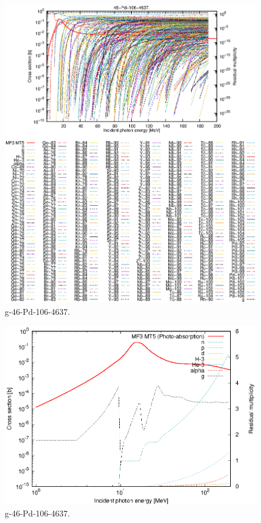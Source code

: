 \begin{figure}
 \includegraphics[width=\linewidth]{eps/g_46-Pd-106_4637.eps}
  \caption{g-46-Pd-106-4637.}
\end{figure}
\newpage \clearpage

\begin{figure}
 \includegraphics[width=\linewidth]{eps-log/g_46-Pd-106_4637.eps}
 \caption{g-46-Pd-106-4637.}
\end{figure}
\newpage \clearpage

